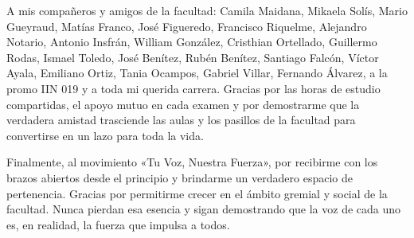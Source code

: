 A mis compañeros y amigos de la facultad: Camila Maidana, Mikaela Solís, Mario Gueyraud, Matías
Franco, José Figueredo, Francisco Riquelme, Alejandro Notario, Antonio Insfrán, William González,
Cristhian Ortellado, Guillermo Rodas, Ismael Toledo, José Benítez, Rubén Benítez, Santiago Falcón,
Víctor Ayala, Emiliano Ortiz, Tania Ocampos, Gabriel Villar, Fernando Álvarez, a la promo 
IIN 019 y a toda mi querida carrera. Gracias por las horas de estudio compartidas, el apoyo mutuo en cada examen y por
demostrarme que la verdadera amistad trasciende las aulas y los pasillos de la facultad para
convertirse en un lazo para toda la vida.

Finalmente, al movimiento «Tu Voz, Nuestra Fuerza», por recibirme con los brazos abiertos desde 
el principio y brindarme un verdadero espacio de pertenencia. Gracias por permitirme crecer en 
el ámbito gremial y social de la facultad. Nunca pierdan esa esencia y sigan demostrando que la 
voz de cada uno es, en realidad, la fuerza que impulsa a todos.

\vspace{0.5cm}

